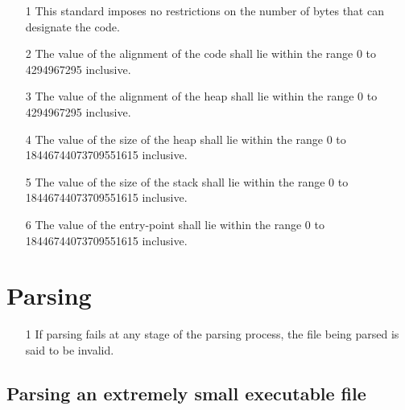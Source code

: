 \documentclass[a4paper]{article}
\begin{document}
    \begin{enumerate}
        \item[1 ] This standard imposes no restrictions on the number of bytes that can designate the code.
        \item[2 ] The value of the alignment of the code shall lie within the range 0 to 4294967295 inclusive.
        \item[3 ] The value of the alignment of the heap shall lie within the range 0 to 4294967295 inclusive.
        \item[4 ] The value of the size of the heap shall lie within the range 0 to 18446744073709551615 inclusive.
        \item[5 ] The value of the size of the stack shall lie within the range 0 to 18446744073709551615 inclusive.
        \item[6 ] The value of the entry-point shall lie within the range 0 to 18446744073709551615 inclusive.
    \end{enumerate}

    \section{Parsing}

    \begin{enumerate}
        \item[1 ] If parsing fails at any stage of the parsing process, the file being parsed is said to be invalid.
    \end{enumerate}
    
    \subsection{Parsing an extremely small executable file}
\end{document}
